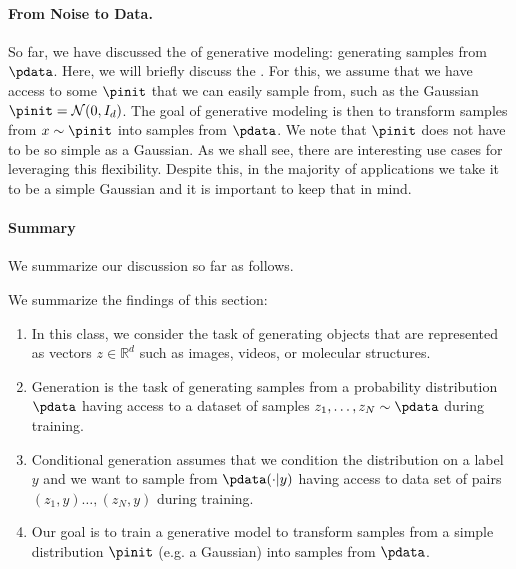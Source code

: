 \paragraph{From Noise to Data.} So far, we have discussed the  of generative modeling: generating samples from $\pdata$. Here, we will briefly discuss the . For this, we assume that we have access to some  $\pinit$ that we can easily sample from, such as the Gaussian $\pinit=\mathcal{N}(0,I_d)$. The goal of generative modeling is then to transform samples from $x\sim \pinit$ into samples from $\pdata$. We note that $\pinit$ does not have to be so simple as a Gaussian. As we shall see, there are interesting use cases for leveraging this flexibility. Despite this, in the majority of applications we take it to be a simple Gaussian and it is important to keep that in mind.

\paragraph{Summary} We summarize our discussion so far as follows.\label{par:summary}
\begin{summarybox} We summarize the findings of this section:
\begin{enumerate}
\item In this class, we consider the task of generating objects that are represented as vectors $z\in\mathbb{R}^d$ such as images, videos, or molecular structures.
\item Generation is the task of generating samples from a probability distribution $\pdata$ having access to a dataset of samples $z_1,\dots,z_N\sim \pdata$ during training. 
\item Conditional generation assumes that we condition the distribution on a label $y$ and we want to sample from $\pdata(\cdot|y)$ having access to data set of pairs $(z_1,y)\dots,(z_N,y)$ during training.
\item Our goal is to train a generative model to transform samples from a simple distribution $\pinit$ (e.g. a Gaussian) into samples from $\pdata$.
\end{enumerate}
\end{summarybox}
